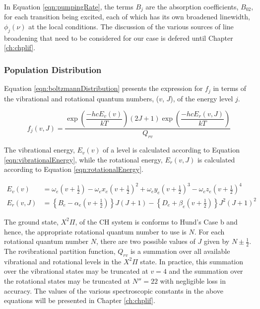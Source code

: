 In Equation \ref{eqn:pumpingRate}, the terms \(B_j\) are the absorption coefficients, \(B_{02}\), for each transition being excited, each of which has its own broadened linewidth, \(\phi_j(\nu)\) at the local conditions.
The discussion of the various sources of line broadening that need to be considered for our case is defered until Chapter \ref{ch:chplif}.

\subsubsection{Population Distribution}
\label{subsubsec:improved-model-population-distribution}

Equation \ref{eqn:boltzmannDistribution} presents the expression for \(f_j\) in terms of the vibrational and rotational quantum numbers, (\(v\), \(J\)), of the energy level \(j\).

\begin{equation}
  f_j(v,J) = \frac{ \exp{\left(\dfrac{-hcE_v(v)}{kT}\right)} (2J + 1)\exp{\left(\dfrac{-hcE_r(v, J)}{kT}\right)} }{ Q_{rv} }
  \label{eqn:boltzmannDistribution}
\end{equation}


The vibrational energy, \(E_v(v)\) of a level is calculated according to Equation \ref{eqn:vibrationalEnergy}, while the rotational energy, \(E_r(v,J)\) is calculated according to Equation \ref{eqn:rotationalEnergy}.

\begin{align}
  E_v(v) &= \omega_e \left(v+\frac{1}{2}\right) - \omega_ex_e \left(v+\frac{1}{2}\right)^2 + \omega_ey_e \left(v+\frac{1}{2}\right)^3 - \omega_ez_e \left(v+\frac{1}{2}\right)^4
  \label{eqn:vibrationalEnergy}\\
  E_r(v, J) &= \left\{B_e - \alpha_e \left(v+\frac{1}{2}\right)\right\}J(J+1) - \left\{D_e + \beta_e \left(v+\frac{1}{2}\right)\right\}J^2(J+1)^2
  \label{eqn:rotationalEnergy}
\end{align}


The ground state, \(X^2\Pi\), of the CH system is conforms to Hund's Case b\cite{1987-bernath} and hence, the appropriate rotational quantum number to use is \(N\).
For each rotational quantum number \(N\), there are two possible values of \(J\) given by \(N \pm \frac{1}{2}\).
The rovibrational partition function, \(Q_{rv}\) is a summation over all available vibrational and rotational levels in the \(X^2\Pi\) state.
In practice, this summation over the vibrational states may be truncated at \(v=4\) and the summation over the rotational states may be truncated at \(N''=22\) with negligible loss in accuracy.
The values of the various spectroscopic constants in the above equations will be presented in Chapter \ref{ch:chplif}.

